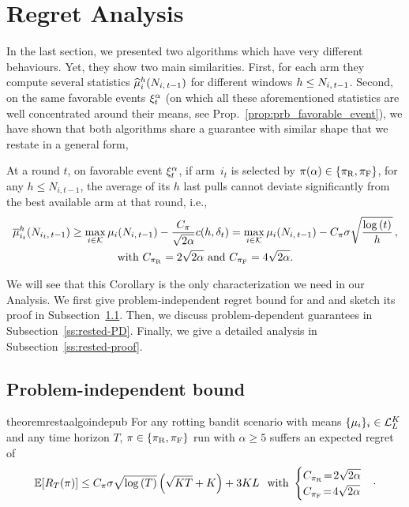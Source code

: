 \section{Regret Analysis}\label{sec:theory}

In the last section, we presented two algorithms which have very different behaviours. Yet, they show two main similarities. First, for each arm they compute several statistics $\widehat{\mu}_i^h(N_{i,\,t-1})$ for different windows $h\leq N_{i,\,t-1}$. Second, on the same favorable events $\xi^\alpha_t$ (on which all these aforementioned statistics are well concentrated around their means, see Prop.~\ref{prop:prb_favorable_event}), we have shown that both algorithms share a guarantee with similar shape that we restate in a general form,
\begin{corollary}
\label{cor:core-RAW-FEWA}
At a round $t$, on favorable event $\xi^\alpha_t$, if arm~$i_{t}$ is selected by $\pi(\alpha) \in \left\{ \pi_{\rm R}, \pi_{\rm F}\right\}$, for any $h \leq N_{i,t-1}$,  the average of its $h$ last pulls cannot deviate significantly from the best available arm at that round, i.e.,
%
\begin{multline*}
\overline{\mu}_{i_t}^{h}(N_{i_t,\, t-1}) \geq \max_{i \in \mathcal{K}} \mu_{i}(N_{i,\,t-1}) - \frac{C_\pi}{\sqrt{2\alpha}} c(h, \delta_t) = \max_{i \in \mathcal{K}} \mu_{i}(N_{i,\,t-1}) - C_\pi \sigma\sqrt{\frac{\log\left(t\right)}{h}}\,,\\
\text{with } C_{\pi_{\rm R}} = 2\sqrt{2\alpha} \text{ and } C_{\pi_{\rm F}} = 4\sqrt{2\alpha}.
\end{multline*}
\end{corollary}

We will see that this Corollary is the only characterization we need in our Analysis. We first give problem-independent regret bound for \FEWA and \RUCB and sketch its proof in Subsection~\ref{ss:rested-PI}. Then, we discuss problem-dependent guarantees in Subsection~\ref{ss:rested-PD}. Finally, we give a detailed analysis in Subsection~\ref{ss:rested-proof}.


\subsection{Problem-independent bound}
\label{ss:rested-PI}
\begin{restatable}{theorem}{restaalgoindepub}
\label{th:rested-PI}
For any rotting bandit scenario with means $\{\mu_i\}_{i} \in \mathcal{L}_L^K$ and any time horizon $T$, $\pi \in \left\{\pi_{\rm R}, \pi_{\rm F} \right\}$ run with $\alpha \geq 5$ suffers an expected regret of
\begin{equation*}
\mathbb{E}[R_T(\pi)] \leq C_\pi \sigma \sqrt{\log\left(T\right)}\left(\sqrt{KT} +K\right) + 3KL\, \;\; \text{with } 
\begin{cases}
C_{\pi_{\rm R}} \!=\! 2\sqrt{2\alpha}\\
C_{\pi_{\rm F}} \!=\! 4\sqrt{2\alpha}
\end{cases}\!\cdot
\end{equation*}
\end{restatable}

